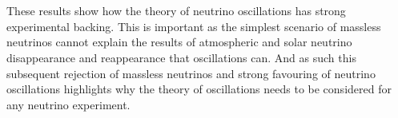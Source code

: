 \\\\These results show how the theory of neutrino oscillations has strong experimental backing. This is important as the simplest scenario of massless neutrinos cannot explain the results of atmospheric and solar neutrino disappearance and reappearance that oscillations can. And as such this subsequent rejection of massless neutrinos and strong favouring of neutrino oscillations highlights why the theory of oscillations needs to be considered for any neutrino experiment. 

